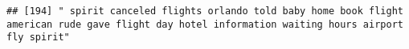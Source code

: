 \documentclass[
]{article}
\begin{document}
\begin{verbatim}
## [194] " spirit canceled flights orlando told baby home book flight american rude gave flight day hotel information waiting hours airport fly spirit"                                                                                                                                                                                                                                                                                                                                                                                                                                                                                                                                                                                                                                                                                                                                                                                                                                                                                                                                                                                                                                                                                                                                                                                                                                                                                                                                                                                                                                                                                                                                                                                                                                                  

\end{verbatim}
\end{document}
